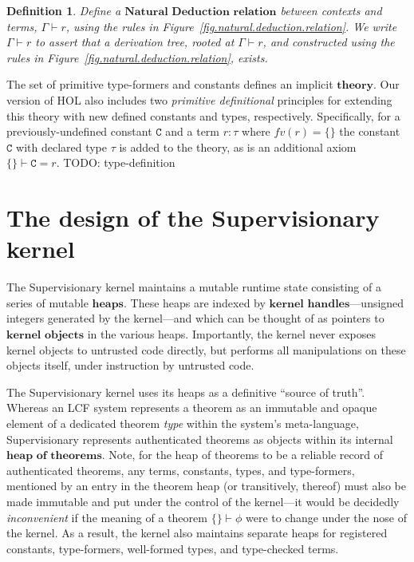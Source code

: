 \documentclass[a4paper, 10pt]{article}
\newtheorem{definition}{Definition}[section]
\newcommand{\deffont}[1]{\ensuremath{\textbf{#1}}}
\begin{document}
\begin{definition}
\label{defn.natural.deduction}
Define a \deffont{Natural Deduction relation} between contexts and terms, $\Gamma \vdash r$, using the rules in Figure~\ref{fig.natural.deduction.relation}.
We write $\Gamma \vdash r$ to assert that a derivation tree, rooted at $\Gamma \vdash r$, and constructed using the rules in Figure~\ref{fig.natural.deduction.relation}, exists.
\end{definition}


The set of primitive type-formers and constants defines an implicit \deffont{theory}.
Our version of HOL also includes two \emph{primitive definitional} principles for extending this theory with new defined constants and types, respectively.
Specifically, for a previously-undefined constant $\mathtt{C}$ and a term $r : \tau$ where $fv(r) = \{\}$ the constant $\mathtt{C}$ with declared type $\tau$ is added to the theory, as is an additional axiom $\{\} \vdash \mathtt{C} = r$.
TODO: type-definition

\section{The design of the Supervisionary kernel}
\label{sect.design.supervisionary.kernel}

The Supervisionary kernel maintains a mutable runtime state consisting of a series of mutable \deffont{heaps}.
These heaps are indexed by \deffont{kernel handles}---unsigned integers generated by the kernel---and which can be thought of as pointers to \deffont{kernel objects} in the various heaps.
Importantly, the kernel never exposes kernel objects to untrusted code directly, but performs all manipulations on these objects itself, under instruction by untrusted code.

The Supervisionary kernel uses its heaps as a definitive ``source of truth''.
Whereas an LCF system represents a theorem as an immutable and opaque element of a dedicated theorem \emph{type} within the system's meta-language, Supervisionary represents authenticated theorems as objects within its internal \deffont{heap of theorems}.
Note, for the heap of theorems to be a reliable record of authenticated theorems, any terms, constants, types, and type-formers, mentioned by an entry in the theorem heap (or transitively, thereof) must also be made immutable and put under the control of the kernel---it would be decidedly \emph{inconvenient} if the meaning of a theorem $\{ \} \vdash \phi$ were to change under the nose of the kernel.
As a result, the kernel also maintains separate heaps for registered constants, type-formers, well-formed types, and type-checked terms.
\end{document}
